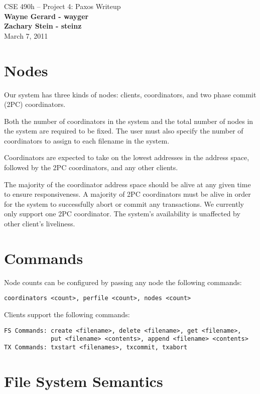 \documentclass[11pt]{article}
\begin{document}
\begin{center}
{\large CSE 490h -- Project 4: Paxos Writeup} \\
\textbf{Wayne Gerard - wayger} \\
\textbf{Zachary Stein - steinz} \\
March 7, 2011
\end{center}

\section{Nodes}

Our system has three kinds of nodes: clients, coordinators, and two phase commit (2PC) coordinators.

Both the number of coordinators in the system and the total number of nodes in the system are required to be fixed.
The user must also specify the number of coordinators to assign to each filename in the system.

Coordinators are expected to take on the lowest addresses in the address space, followed by the 2PC coordinators, and any other clients.

The majority of the coordinator address space should be alive at any given time to ensure responsiveness.
A majority of 2PC coordinators must be alive in order for the system to successfully abort or commit any transactions.
We currently only support one 2PC coordinator.
The system's availability is unaffected by other client's liveliness.

\section{Commands} 

Node counts can be configured by passing any node the following commands:
\begin{verbatim}
coordinators <count>, perfile <count>, nodes <count>
\end{verbatim}

Clients support the following commands:
\begin{verbatim}
FS Commands: create <filename>, delete <filename>, get <filename>, 
             put <filename> <contents>, append <filename> <contents>
TX Commands: txstart <filenames>, txcommit, txabort
\end{verbatim}

\section{File System Semantics} 
\end{document}
